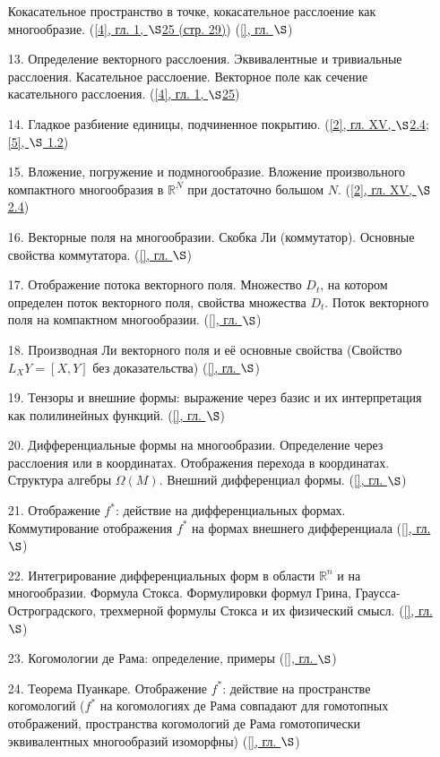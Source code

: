 \begin{enumerate}
	Кокасательное пространство в точке, кокасательное расслоение как многообразие. (\href{Books/book4#page.29}{[4], гл. 1, $\S$25 (стр. 29)}) (\href{Books/book#page.}{[], гл. $\S$})
\item[13.] 
	Определение векторного расслоения. Эквивалентные и тривиальные расслоения. Касательное расслоение. Векторное поле как сечение касательного расслоения. (\href{Books/book4#page.}{[4], гл. 1, $\S$25})
\item[14.] 
	Гладкое разбиение единицы, подчиненное покрытию. (\href{Books/book2#page.}{[2], гл. XV, $\S$2.4}; \href{Books/book5#page.}{[5], $\S$ 1.2})
\item[15.] 
	Вложение, погружение и подмногообразие. Вложение произвольного компактного многообразия в $\mathbb{R}^N$ при достаточно большом $N$. (\href{Books/book2#page.}{[2], гл. XV, $\S$2.4})
\item[16.] 
	Векторные поля на многообразии. Скобка Ли (коммутатор). Основные свойства коммутатора. (\href{Books/book#page.}{[], гл. $\S$})
\item[17.] 
	Отображение потока векторного поля. Множество $D_t$, на котором определен поток векторного поля, свойства множества $D_t$. Поток векторного поля на компактном многообразии. (\href{Books/book#page.}{[], гл. $\S$})
\item[18.] 
	Производная Ли векторного поля и её основные свойства (Свойство $L_X Y = [X,Y]$ без доказательства) (\href{Books/book#page.}{[], гл. $\S$})
\item[19.] 
	Тензоры и внешние формы: выражение через базис и их интерпретация как полилинейных функций. (\href{Books/book#page.}{[], гл. $\S$})
\item[20.] 
	Дифференциальные формы на многообразии. Определение через расслоения или в координатах. Отображения перехода в координатах. Структура алгебры $\Omega(M)$. Внешний дифференциал формы. (\href{Books/book#page.}{[], гл. $\S$})
\item[21.] 
	Отображение $f^*$: действие на дифференциальных формах. Коммутирование отображения $f^*$ на формах внешнего дифференциала (\href{Books/book#page.}{[], гл. $\S$})
\item[22.] 
	Интегрирование дифференциальных форм в области $\mathbb{R}^n$ и на многообразии. Формула Стокса. Формулировки формул Грина, Граусса-Остроградского, трехмерной формулы Стокса и их физический смысл. (\href{Books/book#page.}{[], гл. $\S$})
\item[23.] 
	Когомологии де Рама: определение, примеры (\href{Books/book#page.}{[], гл. $\S$})
\item[24.] 
	Теорема Пуанкаре. Отображение $f^*$: действие на пространстве когомологий ($f^*$ на когомологиях де Рама совпадают для гомотопных отображений, пространства когомологий де Рама гомотопически эквивалентных многообразий изоморфны) (\href{Books/book#page.}{[], гл. $\S$})
\end{enumerate}